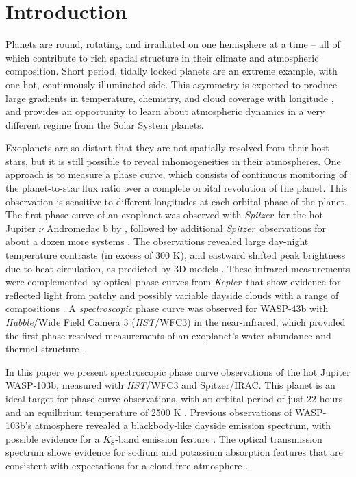 \documentclass[twocolumn]{aastex61}
\newcommand{\project}[1]{\textsl{#1}}
\newcommand{\HST}{\project{HST}}
\newcommand{\Spitzer}{\project{Spitzer}}
\newcommand{\Kepler}{\project{Kepler}}
\begin{document}


\section{Introduction} \label{sec:intro}
Planets are round, rotating, and irradiated on one hemisphere at a time -- all of which contribute to rich spatial structure in their climate and atmospheric composition.  Short period, tidally locked planets are an extreme example, with one hot, continuously illuminated side. This asymmetry is expected to produce large gradients in temperature, chemistry, and cloud coverage with longitude \citep{showman09, kataria16, parmentier16}, and provides an opportunity to learn about atmospheric dynamics in a very different regime from the Solar System planets.

Exoplanets are so distant that they are not spatially resolved from their host stars, but it is still possible to reveal inhomogeneities in their atmospheres. One approach is to measure a phase curve, which consists of continuous monitoring of the planet-to-star flux ratio over a complete orbital revolution of the planet. This observation is sensitive to different longitudes at each orbital phase of the planet.  The first phase curve of an exoplanet was observed with \Spitzer\ for the hot Jupiter $\nu$ Andromedae b by \cite{harrington06}, followed by additional \Spitzer\ observations for about a dozen more systems \citep[cataloged in][]{parmentier17}.  The observations revealed large day-night temperature contrasts (in excess of 300 K), and eastward shifted peak brightness due to heat circulation, as predicted by 3D models \citep{showman02}.  These infrared measurements were complemented by optical phase curves from \Kepler\ that show evidence for reflected light from patchy and possibly variable dayside clouds with a range of compositions \citep{borucki09, demory13, hu15, armstrong16, parmentier16}. A \emph{spectroscopic} phase curve was observed for WASP-43b with \emph{Hubble}/Wide Field Camera 3 (\HST/WFC3) in the near-infrared, which provided the first phase-resolved measurements of an exoplanet's water abundance and thermal structure \citep{stevenson14, stevenson17}.

In this paper we present spectroscopic phase curve observations of the hot Jupiter WASP-103b, measured with \HST/WFC3 and Spitzer/IRAC. This planet is an ideal target for phase curve observations, with an orbital period of just 22 hours and an equilbrium temperature of 2500 K \citep{gillon14}.  Previous observations of WASP-103b's atmosphere revealed a blackbody-like dayside emission spectrum, with possible evidence for a $K_\mathrm{S}$-band emission feature \citep{cartier17, delrez18}. The optical transmission spectrum shows evidence for sodium and potassium absorption features that are consistent with expectations for a cloud-free atmosphere \citep{lendl17}.%
\end{document}
